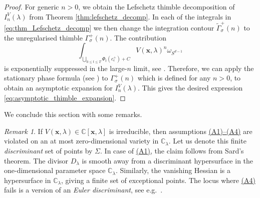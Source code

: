 \documentclass[11pt, a4paper]{article}
\numberwithin{theorem}{section}
\theoremstyle{remark}
\newtheorem{remark}[theorem]{Remark}
\newcommand{\CC}{\mathbb{C}}
\newcommand{\bb}[1]{\boldsymbol{#1}}
\theoremstyle{theorem}
\begin{document}
\begin{proof}
  For generic $n>0$, we obtain the Lefschetz thimble decomposition of $I^V_n(\lambda)$ from Theorem \ref{thm:lefschetz_decomp}. 
  In each of the integrals in \eqref{eq:thm_Lefschetz_decomp} we then change the integration contour $\widetilde{\Gamma}^+_\sigma(n)$ to the unregularised thimble $\Gamma^+_\sigma(n)$. The contribution 
  \[
    \int_{\bigcup_{0\leq t\leq T} \Phi_t(c_\epsilon^+) + C} V(\bb{x},\lambda)^n \omega_{S^{d-1}}
  \]
  is exponentially suppressed in the large-$n$ limit, see \cite[(4.5)]{matsubara2023localization}.
  Therefore, we can apply the stationary phase formula (see \cite[(4.7)]{matsubara2023localization}) to $\Gamma^+_\sigma(n)$ which is defined for any $n>0$, to obtain an asymptotic expansion for $I_n^V(\lambda)$. This gives the desired expression \eqref{eq:asymptotic_thimble_expansion}.
\end{proof}

We conclude this section with some remarks. 

\begin{remark}
  \label{rem:discriminant}
  If $V(\bb{x},\lambda)\in \CC[\bb{x},\lambda]$ is irreducible, then assumptions \hyperref[ass:A1]{(A1)--(A4)} are violated on an at most zero-dimensional variety in $\CC_\lambda$. Let us denote this finite \emph{discriminant} set of points by $\Sigma$. In case of \hyperref[ass:A1]{(A1)}, the claim follows from Sard's theorem. The divisor $D_\lambda$ is smooth away from a discriminant hypersurface in the one-dimensional parameter space $\CC_\lambda$. Similarly, the vanishing Hessian is a hypersurface in $\CC_\lambda$, giving a finite set of exceptional points. The locus where \hyperref[ass:A4]{(A4)} fails is a version of an \emph{Euler discriminant}, see e.g.\ \cite{telen2024euler}.
\end{remark}
\end{document}
